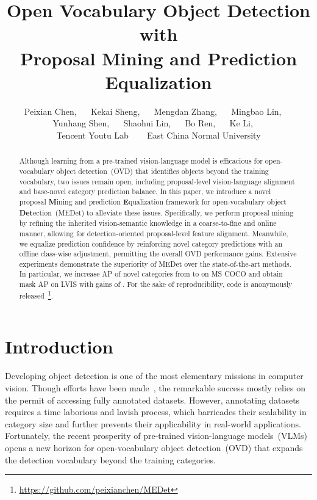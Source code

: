 \documentclass[10pt,twocolumn,letterpaper]{article}
\begin{document}
\title{Open Vocabulary Object Detection with \\ Proposal Mining and Prediction Equalization}



\author{Peixian Chen\footnotemark[1], ~~
Kekai Sheng\footnotemark[1], ~~
Mengdan Zhang\footnotemark[4], ~~
Mingbao Lin, ~~ \\
Yunhang Shen, ~~ 
Shaohui Lin, ~~
Bo Ren, ~~
Ke Li, ~~ \\
[0.2cm]
 Tencent Youtu Lab  ~~~ 
 East China Normal University
}

\maketitle



\begin{abstract}
Although learning from a pre-trained vision-language model is efficacious for open-vocabulary object detection~(OVD) that identifies objects beyond the training vocabulary, two issues remain open, including proposal-level vision-language alignment and base-novel category prediction balance.
In this paper, we introduce a novel proposal \textbf{M}ining and prediction \textbf{E}qualization framework for open-vocabulary object \textbf{Det}ection~(MEDet) to alleviate these issues.
Specifically, we perform proposal mining by refining the inherited vision-semantic knowledge in a coarse-to-fine and online manner, allowing for detection-oriented proposal-level feature alignment.
Meanwhile, we equalize prediction confidence by reinforcing novel category predictions with an offline class-wise adjustment, permitting the overall OVD performance gains.
Extensive experiments demonstrate the superiority of MEDet over the state-of-the-art methods.
In particular, we increase AP of novel categories from  to  on MS COCO and obtain  mask AP on LVIS with gains of .
For the sake of reproducibility, code is anonymously released~\footnote{\url{https://github.com/peixianchen/MEDet}}.


\end{abstract}

 \renewcommand{\thefootnote}{\fnsymbol{footnote}}
\section{Introduction}
\label{Sec:intro}
Developing object detection is one of the most elementary missions in computer vision. Though efforts have been made~\cite{CascadeRCNN,centernet,fasterrcnn}, the remarkable success mostly relies on the permit of accessing fully annotated datasets. However, annotating datasets requires a time laborious and lavish process, which barricades their scalability in category size and further prevents their applicability in real-world applications.
Fortunately, the recent prosperity of pre-trained vision-language models~(VLMs)~\cite{clip} opens a new horizon for open-vocabulary object detection~(OVD) that expands the detection vocabulary beyond the training categories.
\end{document}

